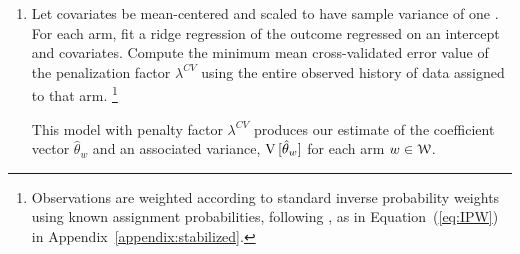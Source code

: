 \documentclass[letterpaper, 12pt, parskip=full,]{scrartcl}
\begin{document}
\begin{enumerate}
\begin{enumerate}
   \item \label{step:fit} Let covariates be mean-centered and scaled to have sample variance of one \citep{marquardt1980you}. For each arm, fit a ridge regression of the outcome regressed on an intercept and covariates. Compute the minimum mean cross-validated error value of the penalization factor $\lambda^{CV}$ using the entire observed history of data assigned to that arm.%
 \footnote{%
% 
%
%
Observations are weighted according to standard inverse probability weights using known assignment probabilities, following \cite{dimakopoulou2017estimation}, as in Equation~(\ref{eq:IPW}) in Appendix~\ref{appendix:stabilized}. %
}
  
  
 This model with penalty factor $\lambda^{CV}$ produces our estimate of the coefficient vector $\hat \theta_w$ and an associated variance, ${\textrm V}\,[\hat\theta_{w}] $ for each arm $w\in {\EuScript W}$. 


\end{enumerate}
\end{enumerate}
\end{document}
